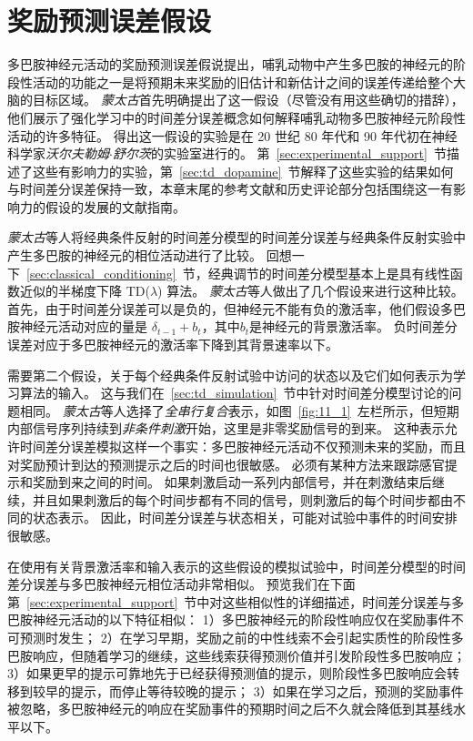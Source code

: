 \section{奖励预测误差假设}

多巴胺神经元活动的奖励预测误差假说提出，哺乳动物中产生多巴胺的神经元的阶段性活动的功能之一是将预期未来奖励的旧估计和新估计之间的误差传递给整个大脑的目标区域。
\textit{蒙太古}\cite{montague1996framework}首先明确提出了这一假设（尽管没有用这些确切的措辞），他们展示了强化学习中的时间差分误差概念如何解释哺乳动物多巴胺神经元阶段性活动的许多特征。
得出这一假设的实验是在 20 世纪 80 年代和 90 年代初在神经科学家\textit{沃尔夫勒姆$\cdot$舒尔茨}的实验室进行的。
第~\ref{sec:experimental_support}~节描述了这些有影响力的实验，第~\ref{sec:td_dopamine}~节解释了这些实验的结果如何与时间差分误差保持一致，本章末尾的参考文献和历史评论部分包括围绕这一有影响力的假设的发展的文献指南。


\textit{蒙太古}\cite{montague1996framework}等人将经典条件反射的时间差分模型的时间差分误差与经典条件反射实验中产生多巴胺的神经元的相位活动进行了比较。
回想一下~\ref{sec:classical_conditioning}~节，经典调节的时间差分模型基本上是具有线性函数近似的半梯度下降 TD($ \lambda $) 算法。
\textit{蒙太古}等人做出了几个假设来进行这种比较。
首先，由于时间差分误差可以是负的，但神经元不能有负的激活率，他们假设多巴胺神经元活动对应的量是 $ \delta_{t-1} + b_t $，其中$ b_t $是神经元的背景激活率。
负时间差分误差对应于多巴胺神经元的激活率下降到其背景速率以下。



需要第二个假设，关于每个经典条件反射试验中访问的状态以及它们如何表示为学习算法的输入。
这与我们在~\ref{sec:td_simulation}~节中针对时间差分模型讨论的问题相同。 
\textit{蒙太古}等人选择了\textit{全串行复合}表示，如图~\ref{fig:11_1}~左栏所示，但短期内部信号序列持续到\textit{非条件刺激}开始，这里是非零奖励信号的到来。
这种表示允许时间差分误差模拟这样一个事实：多巴胺神经元活动不仅预测未来的奖励，而且对奖励预计到达的预测提示之后的时间也很敏感。
必须有某种方法来跟踪感官提示和奖励到来之间的时间。
如果刺激启动一系列内部信号，并在刺激结束后继续，并且如果刺激后的每个时间步都有不同的信号，则刺激后的每个时间步都由不同的状态表示。
因此，时间差分误差与状态相关，可能对试验中事件的时间安排很敏感。


在使用有关背景激活率和输入表示的这些假设的模拟试验中，时间差分模型的时间差分误差与多巴胺神经元相位活动非常相似。
预览我们在下面第~\ref{sec:experimental_support}~节中对这些相似性的详细描述，时间差分误差与多巴胺神经元活动的以下特征相似：
1）多巴胺神经元的阶段性响应仅在奖励事件不可预测时发生；
2）在学习早期，奖励之前的中性线索不会引起实质性的阶段性多巴胺响应，但随着学习的继续，这些线索获得预测价值并引发阶段性多巴胺响应；
3）如果更早的提示可靠地先于已经获得预测值的提示，则阶段性多巴胺响应会转移到较早的提示，而停止等待较晚的提示；
3）如果在学习之后，预测的奖励事件被忽略，多巴胺神经元的响应在奖励事件的预期时间之后不久就会降低到其基线水平以下。


